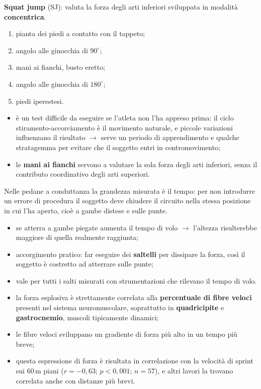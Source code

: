 \textbf{Squat jump} (SJ): valuta la forza degli arti inferiori sviluppata in modalità
  \textbf{concentrica}.

\begin{enumerate}
  \item pianta dei piedi a contatto con il tappeto;
  \item angolo alle ginocchia di $90^\circ$;
  \item mani ai fianchi, busto eretto;
  \item angolo alle ginocchia di $180^\circ$;
  \item piedi iperestesi.
\end{enumerate}

\begin{itemize}
  \item è un test difficile da eseguire se l'atleta non l'ha appreso prima: il ciclo
    stiramento-accorciamento è il movimento naturale, e piccole variazioni influenzano il risultato
    $\rightarrow$ serve un periodo di apprendimento e qualche stratagemma per evitare che il
    soggetto entri in contromovimento;
  \item le \textbf{mani ai fianchi} servono a valutare la sola forza degli arti inferiori, senza il
    contributo coordinativo degli arti superiori.
\end{itemize}

Nelle pedane a conduttanza la grandezza misurata è il tempo: per non introdurre un errore di
  procedura il soggetto deve chiudere il circuito nella stessa posizione in cui l'ha aperto, cioè a
  gambe distese e sulle punte.
\begin{itemize}
  \item se atterra a gambe piegate aumenta il tempo di volo $\rightarrow$ l'altezza risulterebbe
    maggiore di quella realmente raggiunta;
  \item accorgimento pratico: far eseguire dei \textbf{saltelli} per dissipare la forza, così il
    soggetto è costretto ad atterrare sulle punte;
  \item vale per tutti i salti misurati con strumentazioni che rilevano il tempo di volo.
\end{itemize}

\begin{itemize}
  \item la forza esplosiva è strettamente correlata alla \textbf{percentuale di fibre veloci}
    presenti nel sistema neuromuscolare, soprattutto in \textbf{quadricipite} e
    \textbf{gastrocnemio}, muscoli tipicamente dinamici;
  \item le fibre veloci sviluppano un gradiente di forza più alto in un tempo più breve;
  \item questa espressione di forza è risultata in correlazione con la velocità di sprint
    sui 60\,m piani ($r = -0,63$; $p < 0,001$; $n = 57$), e altri lavori la trovano correlata anche
    con distanze più brevi.
\end{itemize}

